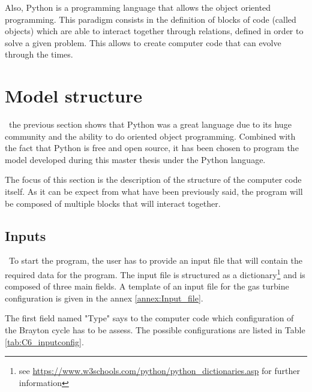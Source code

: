 Also, Python is a programming language that allows the object oriented programming. This paradigm consists in the definition of blocks of code (called objects) which are able to interact together through relations, defined in order to solve a given problem. This allows to create computer code that can evolve through the times. 

\section{Model structure}
\quad\, the previous section shows that Python was a great language due to its huge community and the ability to do oriented object programming. Combined with the fact that Python is free and open source, it has been chosen to program the model developed during this master thesis under the Python language.

The focus of this section is the description of the structure of the computer code itself. As it can be expect from what have been previously said, the program will be composed of multiple blocks that will interact together.

\subsection{Inputs}
\quad\, To start the program, the user has to provide an input file that will contain the required data for the program. The input file is structured as a dictionary\footnote{see \url{https://www.w3schools.com/python/python_dictionaries.asp} for further information} and is composed of three main fields. A template of an input file for the gas turbine configuration is given in the annex \ref{annex:Input_file}.

The first field named "Type" says to the computer code which configuration of the Brayton cycle has to be assess. The possible configurations are listed in Table \ref{tab:C6_inputconfig}.

